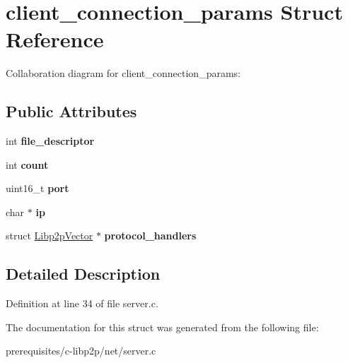 \hypertarget{structclient__connection__params}{}\section{client\+\_\+connection\+\_\+params Struct Reference}
\label{structclient__connection__params}


Collaboration diagram for client\+\_\+connection\+\_\+params\+:
\subsection*{Public Attributes}
\begin{DoxyCompactItemize}
\item 
\mbox{\label{structclient__connection__params_aad2236e5107f14fd80e9b1ae7d927b10}} 
int {\bfseries file\+\_\+descriptor}
\item 
\mbox{\label{structclient__connection__params_a1c328a3118c37cf7a904070b76d9b5a1}} 
int {\bfseries count}
\item 
\mbox{\label{structclient__connection__params_a96de446371537c818895a6e465ec4228}} 
uint16\+\_\+t {\bfseries port}
\item 
\mbox{\label{structclient__connection__params_a52bd36432be938130612b2b903e8a0ed}} 
char $\ast$ {\bfseries ip}
\item 
\mbox{\label{structclient__connection__params_a2acc2c12a47a7afd7cfd726393a24449}} 
struct \mbox{\hyperlink{struct_libp2p_vector}{Libp2p\+Vector}} $\ast$ {\bfseries protocol\+\_\+handlers}
\end{DoxyCompactItemize}


\subsection{Detailed Description}


Definition at line 34 of file server.\+c.



The documentation for this struct was generated from the following file\+:\begin{DoxyCompactItemize}
\item 
prerequisites/c-\/libp2p/net/server.\+c\end{DoxyCompactItemize}
